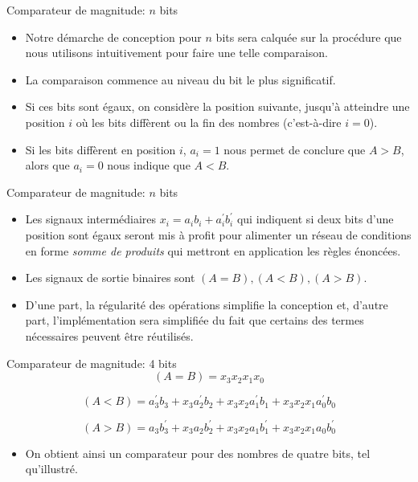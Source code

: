 \documentclass[presentation]{beamer}
\begin{document}
\begin{frame}[label={sec:org9952379}]{Comparateur de magnitude: \(n\) bits}
\begin{itemize}
\item Notre démarche de conception pour \(n\) bits sera calquée sur la procédure que nous utilisons intuitivement pour faire une telle comparaison.

\item La comparaison commence au niveau du bit le plus significatif.

\item Si ces bits sont égaux, on considère la position suivante, jusqu'à atteindre une position \(i\) où les bits diffèrent ou la fin des nombres (c'est-à-dire \(i=0\)).

\item Si les bits diffèrent en position \(i\), \(a_i = 1\) nous permet de conclure que \(A > B\), alors que \(a_i = 0\) nous indique que \(A < B\).
\end{itemize}
\end{frame}

\begin{frame}[label={sec:orge9d244f}]{Comparateur de magnitude: \(n\) bits}
\begin{itemize}
\item Les signaux intermédiaires \(x_i = a_i b_i + a_i^\prime b_i^\prime\) qui indiquent si deux bits d'une position sont égaux seront mis à profit pour alimenter un réseau de conditions en forme \emph{somme de produits} qui mettront en application les règles énoncées.

\item Les signaux de sortie binaires sont \((A = B), (A < B), (A > B)\).

\item D'une part, la régularité des opérations simplifie la conception et, d'autre part, l'implémentation sera simplifiée du fait que certains des termes nécessaires peuvent être réutilisés.
\end{itemize}
\end{frame}

\begin{frame}[label={sec:orga8799e8}]{Comparateur de magnitude: 4 bits}
$$ (A = B) = x_3 x_2 x_1 x_0 $$ 

$$ (A < B) = a_3^\prime b_3 + x_3  a_2^\prime b_2  +  x_3 x_2  a_1^\prime b_1 +  x_3 x_2 x_1  a_0^\prime b_0 $$

$$ (A > B) = a_3 b_3^\prime + x_3  a_2 b_2^\prime  +  x_3 x_2  a_1 b_1^\prime +  x_3 x_2 x_1  a_0 b_0^\prime $$

\begin{itemize}
\item On obtient ainsi un comparateur pour des nombres de quatre bits, tel qu'illustré.
\end{itemize}
\end{frame}
\end{document}
